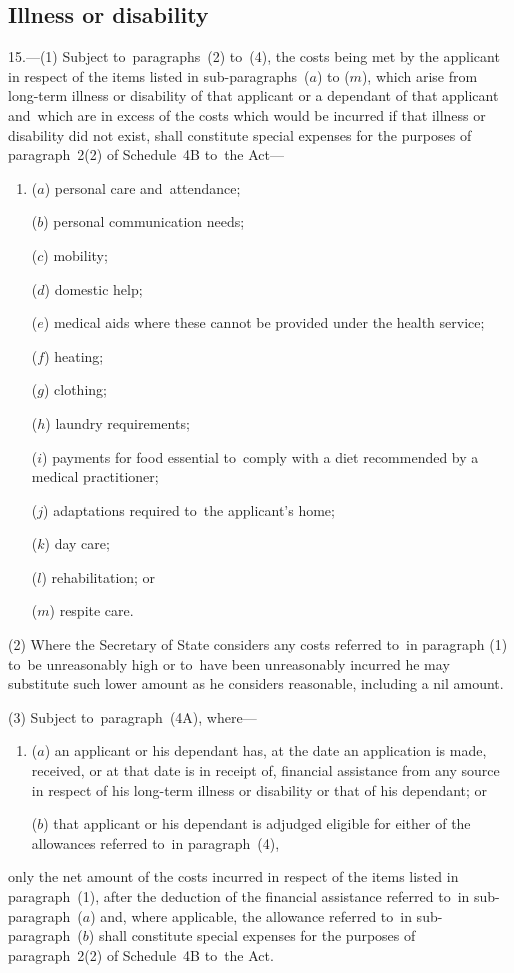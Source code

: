 \documentclass[12pt,a4paper]{article}
\begin{document}

\subsection[15. Illness or disability]{Illness or disability}

15.—(1) Subject to~paragraphs~(2) to~(4), the costs being
met by the applicant in respect of the items listed in sub-paragraphs~($a$) to
($m$), which arise from long-term illness or disability of that applicant or a
dependant of that applicant and~which are in excess of the costs which would be
incurred if that illness or disability did not exist, shall constitute special
expenses for the purposes of paragraph~2(2) of Schedule~4B to~the Act—
\begin{enumerate}\item[]
($a$) personal care and~attendance;

($b$) personal communication needs;

($c$) mobility;

($d$) domestic help;

($e$) medical aids where these cannot be provided under the health service;

($f$) heating;

($g$) clothing;

($h$) laundry requirements;

($i$) payments for food essential to~comply with a diet recommended by a medical
practitioner;

($j$) adaptations required to~the applicant’s home;

($k$) day care;

($l$) rehabilitation; or

($m$) respite care.
\end{enumerate}

(2) Where the Secretary of State considers any costs referred to~in paragraph
(1) to~be unreasonably high or to~have been unreasonably incurred he may
substitute such lower amount as he considers reasonable, including a nil amount.

(3) 
Subject to~paragraph~(4A),  %
where—
\begin{enumerate}\item[]
($a$) an applicant or his dependant has, at the date an application is made,
received, or at that date is in receipt of, financial assistance from any source
in respect of his long-term illness or disability or that of his dependant; or

($b$) that applicant or his dependant is adjudged eligible for either of the
allowances referred to~in paragraph~(4),
\end{enumerate}
only the net amount of the costs incurred in respect of the items listed in
paragraph~(1), after the deduction of the financial assistance referred to~in
sub-paragraph~($a$) and, where applicable, the allowance referred to~in
sub-paragraph~($b$) shall constitute special expenses for the purposes of
paragraph~2(2) of Schedule~4B to~the Act.
\end{document}
